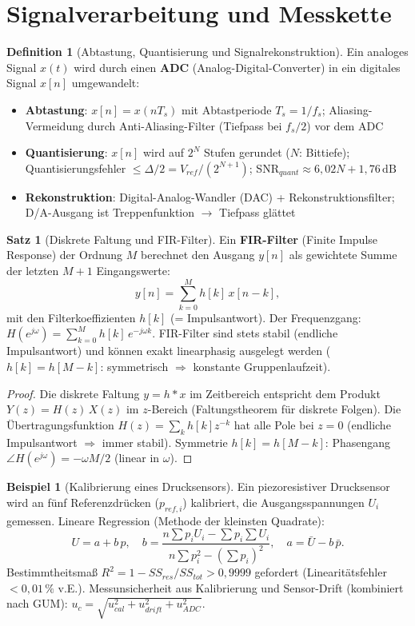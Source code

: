 ﻿\documentclass[a4paper,12pt]{report}
\theoremstyle{definition}
\newtheorem{definition}{Definition}
\newtheorem{beispiel}{Beispiel}
\newtheorem{satz}{Satz}
\begin{document}
\section{Signalverarbeitung und Messkette}

\begin{definition}[Abtastung, Quantisierung und Signalrekonstruktion]
Ein analoges Signal $x(t)$ wird durch einen \textbf{ADC} (Analog-Digital-Converter)
in ein digitales Signal $x[n]$ umgewandelt:
\begin{itemize}
    \item[-] \textbf{Abtastung}: $x[n] = x(nT_s)$ mit Abtastperiode $T_s = 1/f_s$;
          Aliasing-Vermeidung durch Anti-Aliasing-Filter (Tiefpass bei $f_s/2$) vor dem ADC
    \item[-] \textbf{Quantisierung}: $x[n]$ wird auf $2^N$ Stufen gerundet
          ($N$: Bittiefe); Quantisierungsfehler $\le \Delta/2 = V_{ref}/(2^{N+1})$;
          SNR$_{quant} \approx 6{,}02N + 1{,}76\,\mathrm{dB}$
    \item[-] \textbf{Rekonstruktion}: Digital-Analog-Wandler (DAC) + Rekonstruktionsfilter;
          D/A-Ausgang ist Treppenfunktion $\to$ Tiefpass glättet
\end{itemize}
\end{definition}

\begin{satz}[Diskrete Faltung und FIR-Filter]
Ein \textbf{FIR-Filter} (Finite Impulse Response) der Ordnung $M$
berechnet den Ausgang $y[n]$ als gewichtete Summe der letzten $M+1$ Eingangswerte:
\[
  y[n] = \sum_{k=0}^{M} h[k]\,x[n-k],
\]
mit den Filterkoeffizienten $h[k]$ (= Impulsantwort).
Der Frequenzgang: $H(e^{j\omega}) = \sum_{k=0}^M h[k]\,e^{-j\omega k}$.
FIR-Filter sind stets stabil (endliche Impulsantwort) und können
exakt linearphasig ausgelegt werden ($h[k] = h[M-k]$:
symmetrisch $\Rightarrow$ konstante Gruppenlaufzeit).
\end{satz}
\begin{proof}
Die diskrete Faltung $y = h * x$ im Zeitbereich entspricht dem Produkt
$Y(z) = H(z)\,X(z)$ im $z$-Bereich (Faltungstheorem für diskrete Folgen).
Die Übertragungsfunktion $H(z) = \sum_k h[k] z^{-k}$ hat alle Pole bei $z=0$
(endliche Impulsantwort $\Rightarrow$ immer stabil).
Symmetrie $h[k] = h[M-k]$: Phasengang $\angle H(e^{j\omega}) = -\omega M/2$ (linear in $\omega$).
\end{proof}

\begin{beispiel}[Kalibrierung eines Drucksensors]
Ein piezoresistiver Drucksensor wird an fünf Referenzdrücken ($p_{ref,i}$)
kalibriert, die Ausgangsspannungen $U_i$ gemessen.
Lineare Regression (Methode der kleinsten Quadrate):
\[
  U = a + b\,p, \quad
  b = \frac{n\sum p_i U_i - \sum p_i\sum U_i}{n\sum p_i^2 - (\sum p_i)^2}, \quad
  a = \bar{U} - b\,\bar{p}.
\]
Bestimmtheitsmaß $R^2 = 1 - SS_{res}/SS_{tot} > 0{,}9999$ gefordert
(Linearitätsfehler $< 0{,}01\,\%$ v.E.).
Messunsicherheit aus Kalibrierung und Sensor-Drift
(kombiniert nach GUM): $u_c = \sqrt{u_{cal}^2 + u_{drift}^2 + u_{ADC}^2}$.
\end{beispiel}
\end{document}
